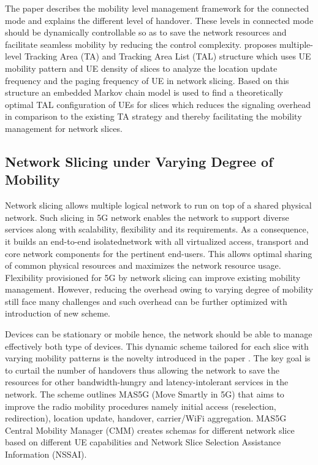 \begin{multicols}{2}
The paper \cite{art1-key05} describes the mobility level management framework for the connected mode and explains the different level of handover. These levels in connected mode should be dynamically controllable so as to save the network resources and facilitate seamless mobility by reducing the control complexity.  \cite{art1-key06} proposes multiple-level Tracking Area (TA) and Tracking  Area List (TAL) structure which uses UE mobility pattern  and UE density of slices to analyze the location update  frequency and the paging frequency of UE in network slicing.  Based on this structure an embedded Markov chain model is used to find a theoretically optimal TAL configuration of UEs  for slices which reduces the signaling overhead in comparison  to the existing TA strategy and thereby facilitating the mobility  management for network slices.

\subsection{Network Slicing under Varying Degree of Mobility}

Network slicing allows multiple logical network to run on top of a shared physical network. Such slicing in 5G network enables the network to support diverse services along with scalability, flexibility and its requirements. As a consequence, it builds an end-to-end isolated\break network with all virtualized access, transport and core network components for the pertinent end-users. This allows optimal sharing of common physical resources and maximizes the network resource usage. Flexibility provisioned for 5G by network slicing can improve existing mobility management. However, reducing the overhead owing to varying degree of mobility still face many challenges and such overhead can be further optimized with introduction of new scheme.

Devices can be stationary or mobile hence, the network should be able to manage effectively both type of devices. This dynamic scheme tailored for each slice with varying mobility patterns is the novelty introduced in the paper \cite{art1-key01}. The key goal is to curtail the number of handovers thus allowing the network to save the resources for other bandwidth-hungry and latency-intolerant services in the network. The scheme outlines MAS5G (Move Smartly in 5G) that aims to improve the radio mobility procedures  namely initial access (reselection, redirection), location update, handover, carrier/WiFi aggregation. MAS5G Central Mobility Manager (CMM) creates schemas for different network slice based on different UE capabilities and Network Slice Selection Assistance Information (NSSAI). 


\end{multicols}
